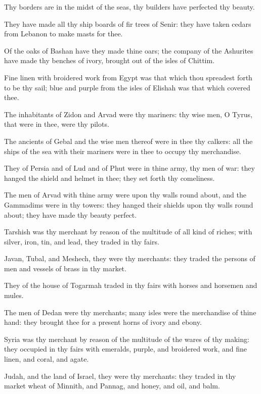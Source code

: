 \Verse Thy borders are in the midst of the seas, thy builders have perfected thy beauty.

\Verse They have made all thy ship boards of fir trees of Senir: they have taken cedars from Lebanon to make masts for thee.

\Verse Of the oaks of Bashan have they made thine oars; the company of the Ashurites have made thy benches of ivory, brought out of the isles of Chittim.

\Verse Fine linen with broidered work from Egypt was that which thou spreadest forth to be thy sail; blue and purple from the isles of Elishah was that which covered thee.

\Verse The inhabitants of Zidon and Arvad were thy mariners: thy wise men, O Tyrus, that were in thee, were thy pilots.

\Verse The ancients of Gebal and the wise men thereof were in thee thy calkers: all the ships of the sea with their mariners were in thee to occupy thy merchandise.

\Verse They of Persia and of Lud and of Phut were in thine army, thy men of war: they hanged the shield and helmet in thee; they set forth thy comeliness.

\Verse The men of Arvad with thine army were upon thy walls round about, and the Gammadims were in thy towers: they hanged their shields upon thy walls round about; they have made thy beauty perfect.

\Verse Tarshish was thy merchant by reason of the multitude of all kind of riches; with silver, iron, tin, and lead, they traded in thy fairs.

\Verse Javan, Tubal, and Meshech, they were thy merchants: they traded the persons of men and vessels of brass in thy market.

\Verse They of the house of Togarmah traded in thy fairs with horses and horsemen and mules.

\Verse The men of Dedan were thy merchants; many isles were the merchandise of thine hand: they brought thee for a present horns of ivory and ebony.

\Verse Syria was thy merchant by reason of the multitude of the wares of thy making: they occupied in thy fairs with emeralds, purple, and broidered work, and fine linen, and coral, and agate.

\Verse Judah, and the land of Israel, they were thy merchants: they traded in thy market wheat of Minnith, and Pannag, and honey, and oil, and balm.

